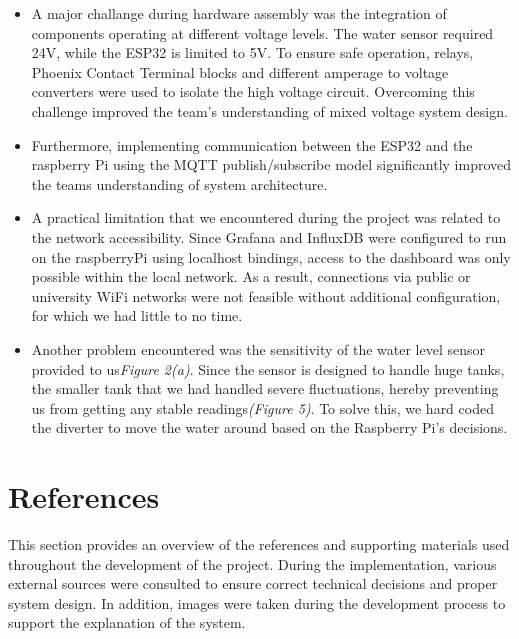 \documentclass[paper=a4,fontsize=12pt,ngerman]{scrartcl}
\begin{document}
\begin{itemize}

    \item A major challange during hardware assembly was the integration of components operating at different voltage levels. The water sensor required 24V, while the ESP32 is limited to 5V. To ensure safe operation, relays, Phoenix Contact Terminal blocks and different amperage to voltage converters were used to isolate the high voltage circuit. Overcoming this challenge improved the team's understanding of mixed voltage system design.

    \item Furthermore, implementing communication between the ESP32 and the raspberry Pi using the MQTT publish/subscribe model significantly improved the teams understanding of system architecture.
    
    \item A practical limitation that we encountered during the project was related to the network accessibility. Since Grafana and InfluxDB were configured to run on the raspberryPi using localhost bindings, access to the dashboard was only possible within the local network. As a result, connections via public or university WiFi networks were not feasible without additional configuration, for which we had little to no time.

    \item Another problem encountered was the sensitivity of the water level sensor provided to us\emph{Figure 2(a)}. Since the sensor is designed to handle huge tanks, the smaller tank that we had handled severe fluctuations, hereby preventing us from getting any stable readings\emph{(Figure 5)}. To solve this, we hard coded the diverter to move the water around based on the Raspberry Pi's decisions.
\end{itemize}

\section{References}
This section provides an overview of the references and supporting materials used throughout the development of the project. During the implementation, various external sources were consulted to ensure correct technical decisions and proper system design. In addition, images were taken during the development process to support the explanation of the system. 
\end{document}
